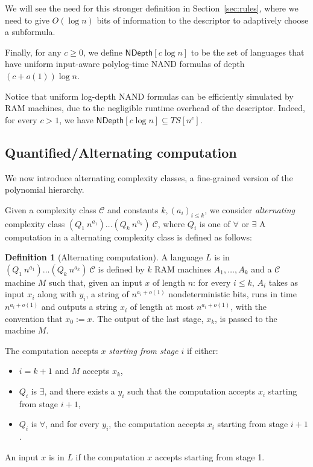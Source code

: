 \documentclass[a4paper, 11pt]{article}
\theoremstyle{plain}
\theoremstyle{definition}
\newtheorem{definition}[theorem]{Definition}
\theoremstyle{remark}
\newcommand{\Cc}{\mathcal{C}}%
\newcommand{\ND}{\textsf{NDepth}}%
\newcommand{\NDL}[1]{\ND\left[ #1 \log n\right]}%
\begin{document}
We will see the need for this stronger definition in Section~\ref{sec:rules}, 
where we need to give $O(\log n)$ bits of information to the descriptor
to adaptively choose a subformula.

Finally, for any $c \ge 0$, we define $\NDL{c}$
to be the set of languages that have uniform 
input-aware polylog-time NAND formulas of depth$(c+o(1)) \log n$.

Notice that uniform log-depth NAND formulas
can be efficiently simulated by RAM machines, 
due to the negligible runtime overhead of the descriptor.
Indeed, for every $c > 1$, we have $\NDL{c} \subseteq TS[n^c]$.

\subsection{Quantified/Alternating computation}

We now introduce alternating complexity classes, a fine-grained version of the polynomial hierarchy.

Given a complexity class $\Cc$ and constants $k, (a_i)_{i\leq k}$, 
we consider \textit{alternating} complexity
class $(Q_1~n^{a_1})\ldots(Q_k~n^{a_k})~\Cc$, 
where $Q_i$ is one of $\forall$ or $\exists$
A computation in a alternating complexity class is defined as follows:
\begin{definition}[Alternating computation]
	A language $L$ is in $(Q_1~n^{a_1})\ldots(Q_k~n^{a_k})~\Cc$ 
	is defined by $k$ RAM machines $A_1, \ldots, A_k$ and a $\Cc$ machine $M$
	such that, given an input $x$ of length $n$:
	for every $i \le k$, $A_{i}$ takes as input $x_i$ along with $y_i$, 
	a string of $n^{a_{i} + o(1)}$ nondeterministic bits,
	runs in time $n^{a_{i} + o(1)}$ and outputs a string $x_{i}$ of length at most $n^{a_{i} + o(1)}$, 
	with the convention that $x_0 := x$.
	The output of the last stage, $x_{k}$, is passed to the machine $M$. 

	The computation accepts $x$ \textit{starting from stage $i$} if either:
	\begin{itemize}
		\item $i = k+1$ and $M$ accepts $x_{k}$, 
		\item $Q_i$ is $\exists$, and there exists a $y_i$ such that the computation
		accepts $x_{i}$ starting from stage $i+1$, 
		\item $Q_i$ is $\forall$, and for every $y_i$, the computation
		accepts $x_{i}$ starting from stage $i+1$. 
	\end{itemize}

	An input $x$ is in $L$ if the computation $x$ accepts starting from stage 1.
\end{definition}
\end{document}

